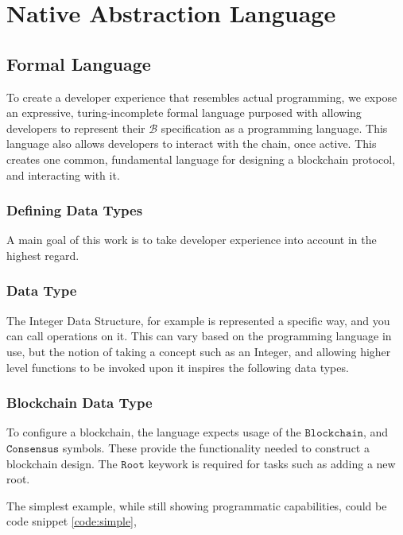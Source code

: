 \documentclass[12pt, titlepage, twocolumn]{report}
\begin{document}
\chapter{Native Abstraction Language}


\section{Formal Language}
To create a developer experience that resembles actual programming, we expose an expressive, turing-incomplete formal language purposed with allowing developers to represent their \( \boldsymbol{\mathcal{B}} \) specification as a programming language. This language also allows developers to interact with the chain, once active. This creates one common, fundamental language for designing a blockchain protocol, and interacting with it. 

\subsection{Defining Data Types}
A main goal of this work is to take developer experience into account in the highest regard.  

\subsection{Data Type}
The Integer Data Structure, for example is represented a specific way, and you can call operations on it. This can vary based on the programming language in use, but the notion of taking a concept such as an Integer, and allowing higher level functions to be invoked upon it inspires the following data types. 

\subsection{Blockchain Data Type}
To configure a blockchain, the language expects usage of the \(\texttt{Blockchain}\), and \(\texttt{Consensus}\) symbols. These provide the functionality needed to construct a blockchain design. The \(\texttt{Root}\) keywork is required for tasks such as adding a new root.

The simplest example, while still showing programmatic capabilities, could be code snippet \ref{code:simple},  
\end{document}
